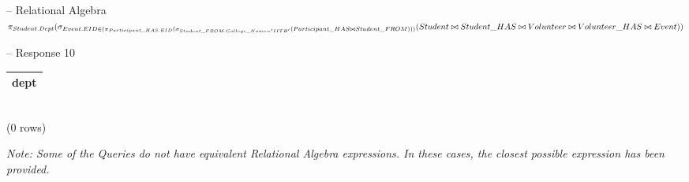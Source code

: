 \documentclass[7pt]{article}
\begin{document}
\begin{itemize}
    -- Relational Algebra \\
    $\pi_{Student.Dept}(\sigma_{Event.EID \in (\pi_{Participant\_HAS.EID}(\sigma_{Student\_FROM.College\_Name = 'IITB'}(Participant\_HAS \bowtie \\ Student\_FROM)))}(Student \bowtie Student\_HAS \bowtie Volunteer \bowtie Volunteer\_HAS \bowtie Event))$ \vspace{2pt}

    -- Response 10 \\
    \begin{tabular}{|c|}
        \hline
        dept \\
        \hline
    \end{tabular} \\
    (0 rows)
\end{itemize}

\begin{flushleft}
    \textit{Note: Some of the Queries do not have equivalent Relational Algebra expressions. In these cases, the closest possible expression has been provided.}
\end{flushleft}
\end{document}
